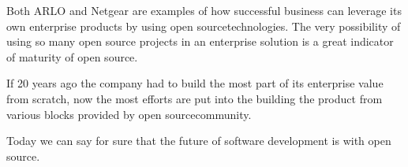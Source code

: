 \documentclass[10pt, a5paper]{article}
\begin{document}
Both ARLO and Netgear are examples of how successful business can leverage its own enterprise products by using open source\linebreak technologies. The very possibility of using so many open source projects in an enterprise solution is a great indicator of maturity of open source.

If 20 years ago the company had to build the most part of its enterprise value from scratch, now the most efforts are put into the building the product from various blocks provided by open source\linebreak community.

Today we can say for sure that the future of software development is with open source.
 
\end{document}
